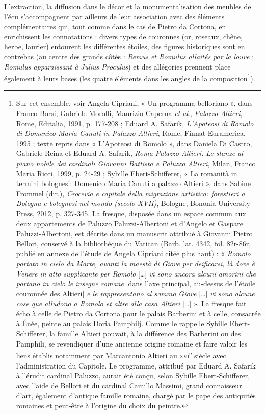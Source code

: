 \documentclass[12pt,twoside,openany]{book}
\begin{document}
L’extraction, la diffusion dans le décor et la monumentalisation des meubles de l’écu s’accompagnent par ailleurs de leur association avec des éléments complémentaires qui, tout comme dans le cas de Pietro da Cortona, en enrichissent les connotations : divers types de couronnes (or, roseaux, chêne, herbe, laurier) entourent les différentes étoiles, des figures historiques sont en contrebas (au centre des grands côtés : \textit{Remus et Romulus allaités par la louve} ; \textit{Romulus apparaissant à Julius Proculus}) et des allégories prennent place également à leurs bases (les quatre éléments dans les angles de la composition\footnote{Sur cet ensemble, voir Angela Cipriani, « Un programma belloriano », dans Franco Borsi, Gabriele Morolli, Maurizio Caperna \textit{et al}., \textit{Palazzo Altieri}, Rome, Editalia, 1991, p. 177-208 ; Eduard A. Safarik, \textit{L’Apoteosi di Romolo di Domenico Maria Canuti in Palazzo Altieri}, Rome, Finnat Euramerica, 1995 ; texte repris dans « L’Apoteosi di Romolo », dans Daniela Di Castro, Gabriele Reina et Eduard A. Safarik, \textit{Roma Palazzo Altieri. Le stanze al piano nobile dei cardinali Giovanni Battista e Paluzzo Altieri}, Milan, Franco Maria Ricci, 1999, p. 24-29 ; Sybille Ebert-Schifferer, « La romanità in termini bolognesi: Domenico Maria Canuti a palazzo Altieri », dans Sabine Frommel (dir.), \textit{Crocevia e capitale della migrazione artistica: forestieri a Bologna e bolognesi nel mondo (secolo XVII)}, Bologne, Bononia University Press, 2012, p. 327-345. La fresque, disposée dans un espace commun aux deux appartements de Paluzzo Paluzzi-Albertoni et d’Angelo et Gaspare Paluzzi-Albertoni, est décrite dans un manuscrit attribué à Giovanni Pietro Bellori, conservé à la bibliothèque du Vatican (Barb. lat. 4342, fol. 82r-86r, publié en annexe de l’étude de Angela Cipriani citée plus haut) : « \textit{Romolo portato in cielo da Marte, avanti la maestà di Giove per deificarsi, là dove è Venere in atto supplicante per Romolo }[…]\textit{ vi sono ancora alcuni amorini che portano in cielo le insegne romane }[dans l’axe principal, au-dessus de l’étoile couronnée des Altieri]\textit{ e le rappresentano al sommo Giove }[…]\textit{ vi sono alcune cose que alludono a Romolo et altre alla casa Altieri }[…] ». La fresque fait écho à celle de Pietro da Cortona pour le palais Barberini et à celle, consacrée à Énée, peinte au palais Doria Pamphilj. Comme le rappelle Sybille Ebert-Schifferer, la famille Altieri pouvait, à la différence des Barberini ou des Pamphili, se revendiquer d’une ancienne origine romaine et faire valoir les liens établis notamment par Marcantonio Altieri au \textsc{xvi}\textsuperscript{e} siècle avec l’administration du Capitole. Le programme, attribué par Eduard A. Safarik à l’érudit cardinal Paluzzo, aurait été conçu, selon Sybille Ebert-Schifferer, avec l’aide de Bellori et du cardinal Camillo Massimi, grand connaisseur d’art, également d’antique famille romaine, chargé par le pape des antiquités romaines et peut-être à l’origine du choix du peintre.}).
\end{document}
